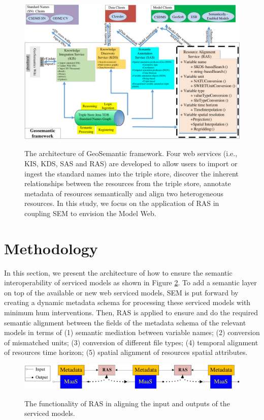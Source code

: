 \documentclass[review]{elsarticle}
\begin{document}
\begin{figure}[!htbp]
\centering
\includegraphics[scale=0.3]{../figures/figure_2}
\label{figure2}
\caption{The architecture of GeoSemantic framework. Four web services (i.e., KIS, KDS, SAS and RAS) are developed to allow users to import or ingest the standard names into the triple store, discover the inherent relationships between the resources from the triple store, annotate metadata of resources semantically and align two heterogeneous resources. In this study, we focus on the application of RAS in coupling SEM to envision the Model Web.}
\end{figure}

\section{Methodology}In this section, we present the architecture of how to ensure the semantic interoperability of serviced models as shown in Figure \ref{figure3}. To add a semantic layer on top of the available or new web serviced models, SEM is put forward by creating a dynamic metadata schema for processing these serviced models with minimum hum interventions. Then, RAS  is applied to ensure and do the required semantic alignment between the fields of the metadata schema of the relevant models in terms of (1) semantic mediation between variable names; (2) conversion of mismatched units; (3) conversion of different file types; (4) temporal alignment of resources time horizon; (5) spatial alignment of resources spatial attributes.

\begin{figure}[!htbp]
\centering
\includegraphics[scale=0.4]{../figures/figure_3}
\label{figure3}
\caption{The functionality of RAS in aligning the input and outputs of the serviced models.}
\end{figure}
\end{document}
